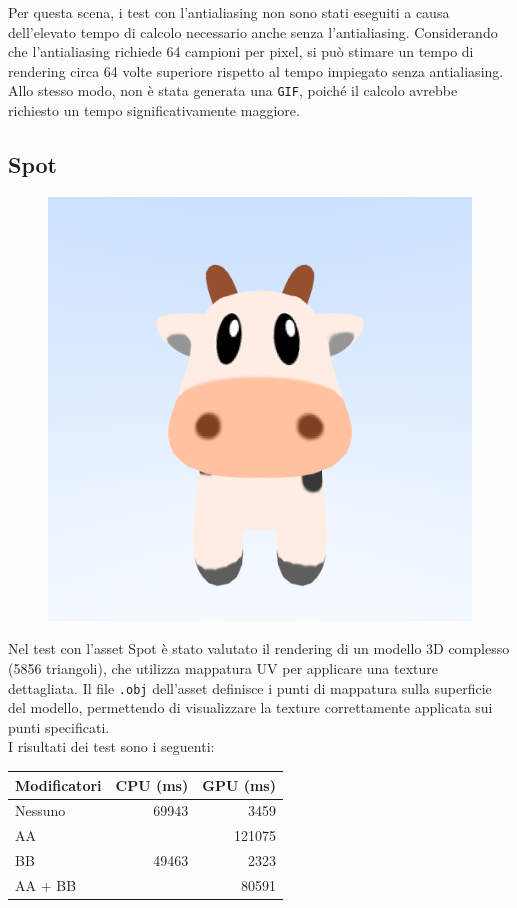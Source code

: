 \documentclass{article}
\begin{document}
Per questa scena, i test con l'antialiasing non sono stati eseguiti a causa dell'elevato tempo di calcolo necessario anche senza l'antialiasing. Considerando che l'antialiasing richiede 64 campioni per pixel, si può stimare un tempo di rendering circa 64 volte superiore rispetto al tempo impiegato senza antialiasing. Allo stesso modo, non è stata generata una \texttt{GIF}, poiché il calcolo avrebbe richiesto un tempo significativamente maggiore.

\subsection{Spot}

\begin{figure}[H]
    \centering
    \includegraphics[width=0.5\linewidth]{spot.png}
    \label{fig:spot}
\end{figure}

Nel test con l'asset Spot\cite{Spot} è stato valutato il rendering di un modello 3D complesso (5856 triangoli), che utilizza mappatura UV per applicare una texture dettagliata. Il file \texttt{.obj} dell'asset definisce i punti di mappatura sulla superficie del modello, permettendo di visualizzare la texture correttamente applicata sui punti specificati.\\

I risultati dei test sono i seguenti:

\begin{table}[H]
    \centering
    \begin{tabular}{|l|r|r|}
    \hline
    \textbf{Modificatori} & \textbf{CPU (ms)}   & \textbf{GPU (ms)} \\ \hline
    Nessuno      & 69943 & 3459   \\ \hline
    AA           &       & 121075 \\ \hline
    BB           & 49463 & 2323   \\ \hline
    AA + BB      &       & 80591  \\ \hline
    \end{tabular}
\end{table}
\end{document}
